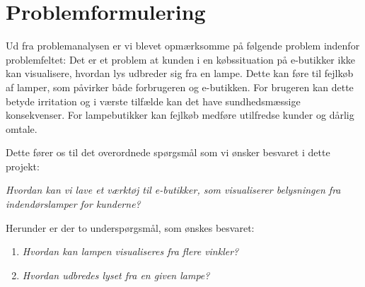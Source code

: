 \section{Problemformulering}

Ud fra problemanalysen er vi blevet opmærksomme på følgende problem indenfor problemfeltet:
Det er et problem at kunden i en købssituation på e-butikker ikke kan visualisere, hvordan lys udbreder sig fra en lampe. Dette kan føre til fejlkøb af lamper, som påvirker både forbrugeren og e-butikken. For brugeren kan dette betyde irritation og i værste tilfælde kan det have sundhedsmæssige konsekvenser. For lampebutikker kan fejlkøb medføre utilfredse kunder og dårlig omtale. 

Dette fører os til det overordnede spørgsmål som vi ønsker besvaret i dette projekt:

\textit{Hvordan kan vi lave et værktøj til e-butikker, som visualiserer belysningen fra indendørslamper for kunderne?}

Herunder er der to underspørgsmål, som ønskes besvaret:

\begin{enumerate}

\item \textit{Hvordan kan lampen visualiseres fra flere vinkler?}
\item \textit{Hvordan udbredes lyset fra en given lampe?}

\end{enumerate}